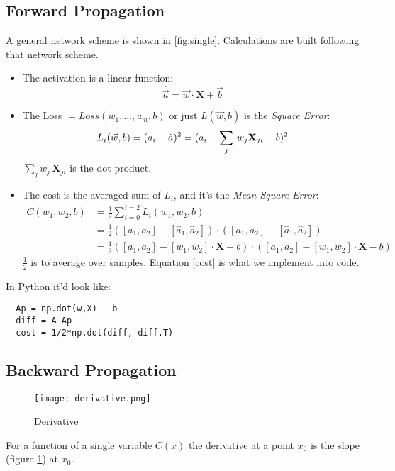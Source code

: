 \subsection{Forward Propagation}
A general network scheme is shown in \ref{fig:single}. Calculations are built following that network scheme. 
\begin{itemize}
  \item The activation is a linear function:
    \[ \hat{\vec{a}} = \vec{w}\cdot\mathbf{X} + \vec{b}\]
  \item The Loss $= Loss(w_1,\ldots, w_n, b)$ or just $L(\vec{w},b)$ is the \textit{Square Error}:
  \[
  L_i(\vec{w}, b) = (a_i - \hat{a})^2\\
  =(a_i -\sum_j\,w_j\mathbf{X}_{ji} -b)^2
\]
$\sum_j w_j\,\mathbf{X}_{ji}$ is the dot product.

\item The cost is the averaged sum of $L_i$, and it's the \textit{Mean Square Error}:
\begin{align}
  C(w_1, w_2, b) &= \frac{1}{2} \sum_{i=0}^{i=2} L_i(w_1, w_2, b)\nonumber\\
  &= \frac{1}{2}([a_1, a_2] - [\hat{a}_1, \hat{a}_2])\cdot{}([a_1, a_2]-[\hat{a}_1, \hat{a}_2])\nonumber\\
  &=\frac{1}{2}([a_1, a_2] - [w_1, w_2]\cdot{}\mathbf{X}-b)\cdot{}([a_1, a_2] - [w_1,w_2]\cdot{}\mathbf{X} -b) \label{cost}
\end{align}
$\frac{1}{2}$ is to average over samples. Equation \ref{cost} is what we implement into code.
\end{itemize}
In Python it'd look like:
\begin{center}
  \begin{BVerbatim}
  Ap = np.dot(w,X) - b
  diff = A-Ap 
  cost = 1/2*np.dot(diff, diff.T)
  \end{BVerbatim}
\end{center}





\subsection{Backward Propagation}
\begin{figure}
  \centering
  \texttt{[image: derivative.png]}
  \caption{Derivative}\label{fig:basics}
\end{figure}

For a function of a single variable $C(x)$ the derivative at a point $x_0$ is the slope (figure \ref{fig:basics}) at $x_0$.

